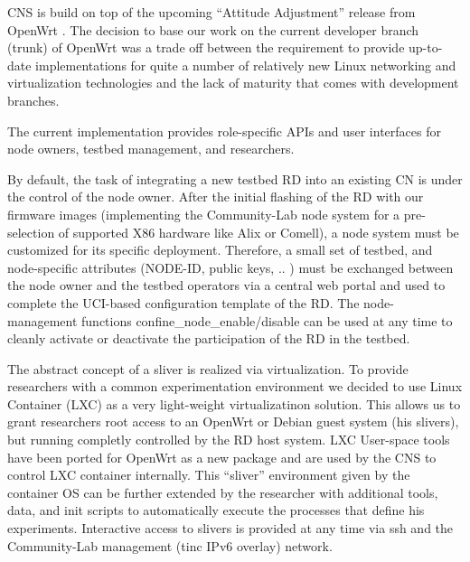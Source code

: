 \documentclass[conference]{IEEEtran}
\begin{document}
CNS is build on top of the upcoming ``Attitude Adjustment'' release
from OpenWrt \cite{attitudeAdjustment}. The decision to base our work
on the current developer branch (trunk) of OpenWrt was a trade off
between the requirement to provide up-to-date implementations for
quite a number of relatively new Linux networking and virtualization
technologies and the lack of maturity that comes with development
branches. 

The current implementation provides role-specific APIs and user
interfaces for node owners, testbed management, and researchers.

By default, the task of integrating a new testbed RD into an existing
CN is under the control of the node owner.  After the initial flashing
of the RD with our firmware images (implementing the Community-Lab node
system for a pre-selection of supported X86 hardware like Alix or
Comell), a node system must be customized for its specific deployment.
Therefore, a small set of testbed, and node-specific attributes
(NODE-ID, public keys, .. ) must be exchanged between the node owner
and the testbed operators via a central web portal and used to
complete the UCI-based configuration template of the RD.  The
node-management functions confine\_node\_enable/disable can be used at
any time to cleanly activate or deactivate the participation of the RD
in the testbed.

The abstract concept of a sliver is realized via virtualization.  To
provide researchers with a common experimentation environment we
decided to use Linux Container (LXC) as a very light-weight
virtualizatinon solution. This allows us to grant researchers root
access to an OpenWrt or Debian guest system (his slivers), but running
completly controlled by the RD host system. LXC User-space
tools have been ported for OpenWrt as a new package and are used by
the CNS to control LXC container internally. This ``sliver''
environment given by the container OS can be further extended by the
researcher with additional tools, data, and init scripts to
automatically execute the processes that define his experiments.
Interactive access to slivers is provided at any time via ssh and the
Community-Lab management (tinc IPv6 overlay) network.
\end{document}
